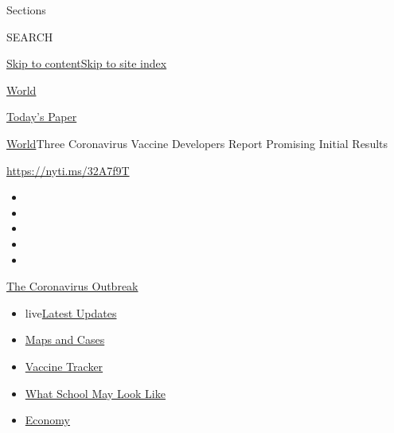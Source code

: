 Sections

SEARCH

\protect\hyperlink{site-content}{Skip to
content}\protect\hyperlink{site-index}{Skip to site index}

\href{https://www.nytimes.com/section/world}{World}

\href{https://myaccount.nytimes.com/auth/login?response_type=cookie\&client_id=vi}{}

\href{https://www.nytimes.com/section/todayspaper}{Today's Paper}

\href{/section/world}{World}\textbar{}Three Coronavirus Vaccine
Developers Report Promising Initial Results

\url{https://nyti.ms/32A7f9T}

\begin{itemize}
\item
\item
\item
\item
\item
\end{itemize}

\href{https://www.nytimes.com/news-event/coronavirus?action=click\&pgtype=Article\&state=default\&region=TOP_BANNER\&context=storylines_menu}{The
Coronavirus Outbreak}

\begin{itemize}
\tightlist
\item
  live\href{https://www.nytimes.com/2020/08/02/world/coronavirus-updates.html?action=click\&pgtype=Article\&state=default\&region=TOP_BANNER\&context=storylines_menu}{Latest
  Updates}
\item
  \href{https://www.nytimes.com/interactive/2020/us/coronavirus-us-cases.html?action=click\&pgtype=Article\&state=default\&region=TOP_BANNER\&context=storylines_menu}{Maps
  and Cases}
\item
  \href{https://www.nytimes.com/interactive/2020/science/coronavirus-vaccine-tracker.html?action=click\&pgtype=Article\&state=default\&region=TOP_BANNER\&context=storylines_menu}{Vaccine
  Tracker}
\item
  \href{https://www.nytimes.com/interactive/2020/07/29/us/schools-reopening-coronavirus.html?action=click\&pgtype=Article\&state=default\&region=TOP_BANNER\&context=storylines_menu}{What
  School May Look Like}
\item
  \href{https://www.nytimes.com/live/2020/07/31/business/stock-market-today-coronavirus?action=click\&pgtype=Article\&state=default\&region=TOP_BANNER\&context=storylines_menu}{Economy}
\end{itemize}

